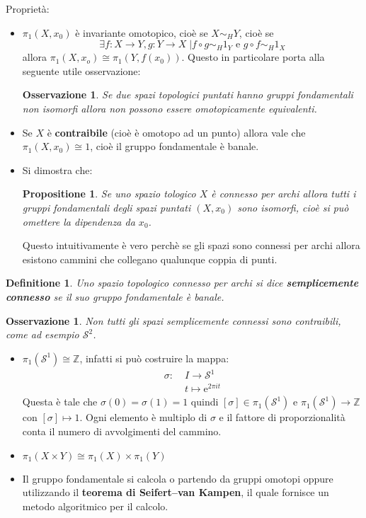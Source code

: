 \documentclass{article}
\newtheorem{proposition}[theorem]{Propositione}
\newtheorem{osservation}[theorem]{Osservazione}
\newtheorem{definition}[theorem]{Definitione}
\newcommand{\Z}{\mathbb{Z}}
\newcommand{\Sph}[1][]{\mathcal{S}^#1}
\begin{document}
Proprietà:
\begin{itemize}
\item $ \pi_1(X,x_0) $ è invariante omotopico, cioè se $ X \sim_H Y $, cioè se
  \[
    \exists f: X \to Y, g: Y \to X \; | f \circ g \sim_H 1_Y \text{ e }  g \circ f \sim_H 1_X
  \]
  allora $ \pi_1(X,x_o) \cong \pi_1(Y,f(x_0)) $. Questo in particolare porta alla seguente
  utile osservazione:
  \begin{osservation}
    Se due spazi topologici puntati hanno gruppi fondamentali non isomorfi allora
    non possono essere omotopicamente equivalenti.
  \end{osservation}
\item Se $ X $ è \textbf{contraibile}  (cioè è
  omotopo ad un punto) allora vale che $ \pi_1(X,x_0) \cong 1 $, cioè il gruppo
  fondamentale è banale.
\item Si dimostra che:
  \begin{proposition}
    Se uno spazio tologico $ X $ è connesso per archi allora tutti i gruppi fondamentali
    degli spazi puntati $ (X,x_0) $ sono isomorfi, cioè si può omettere la dipendenza da $ x_0 $.
  \end{proposition}
  Questo intuitivamente è vero perchè se gli spazi sono connessi per archi allora esistono cammini
  che collegano qualunque coppia di punti.
\end{itemize}

\begin{definition}
  Uno spazio topologico connesso per archi si dice \textbf{semplicemente connesso} 
  se il suo gruppo fondamentale è banale.
\end{definition}

\begin{osservation}
  Non tutti gli spazi semplicemente connessi sono contraibili, come ad esempio $ \Sph{2} $.
\end{osservation}

\begin{itemize}
\item $ \pi_1(\Sph{1}) \cong \Z $, infatti si può costruire la mappa:
  \begin{align*}
    \sigma: &\; I \to \Sph{1} \\
       &\;  t \mapsto \mathrm{e}^{2 \pi i t}
  \end{align*}
  Questa è tale che $ \sigma(0) = \sigma(1) = 1 $ quindi $ [\sigma] \in \pi_1(\Sph{1}) $ e $ \pi_1(\Sph{1}) \to \Z $ con $ [\sigma] \mapsto 1 $.
  Ogni elemento è multiplo di $ \sigma $ e il fattore di proporzionalità conta il numero di avvolgimenti
  del cammino.
\item $ \pi_1(X \times Y) \cong \pi_1(X) \times \pi_1(Y) $
\item Il gruppo fondamentale si calcola o partendo da gruppi omotopi oppure utilizzando il \textbf{teorema di Seifert–van Kampen}, 
  il quale fornisce un metodo algoritmico per il calcolo.
\end{itemize}
\end{document}
